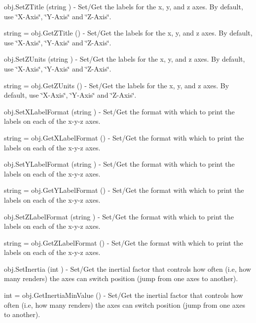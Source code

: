 \begin{DoxyItemize}
\item {\ttfamily obj.\-Set\-Z\-Title (string )} -\/ Set/\-Get the labels for the x, y, and z axes. By default, use \char`\"{}\-X-\/\-Axis\char`\"{}, \char`\"{}\-Y-\/\-Axis\char`\"{} and \char`\"{}\-Z-\/\-Axis\char`\"{}.  
\item {\ttfamily string = obj.\-Get\-Z\-Title ()} -\/ Set/\-Get the labels for the x, y, and z axes. By default, use \char`\"{}\-X-\/\-Axis\char`\"{}, \char`\"{}\-Y-\/\-Axis\char`\"{} and \char`\"{}\-Z-\/\-Axis\char`\"{}.  
\item {\ttfamily obj.\-Set\-Z\-Units (string )} -\/ Set/\-Get the labels for the x, y, and z axes. By default, use \char`\"{}\-X-\/\-Axis\char`\"{}, \char`\"{}\-Y-\/\-Axis\char`\"{} and \char`\"{}\-Z-\/\-Axis\char`\"{}.  
\item {\ttfamily string = obj.\-Get\-Z\-Units ()} -\/ Set/\-Get the labels for the x, y, and z axes. By default, use \char`\"{}\-X-\/\-Axis\char`\"{}, \char`\"{}\-Y-\/\-Axis\char`\"{} and \char`\"{}\-Z-\/\-Axis\char`\"{}.  
\item {\ttfamily obj.\-Set\-X\-Label\-Format (string )} -\/ Set/\-Get the format with which to print the labels on each of the x-\/y-\/z axes.  
\item {\ttfamily string = obj.\-Get\-X\-Label\-Format ()} -\/ Set/\-Get the format with which to print the labels on each of the x-\/y-\/z axes.  
\item {\ttfamily obj.\-Set\-Y\-Label\-Format (string )} -\/ Set/\-Get the format with which to print the labels on each of the x-\/y-\/z axes.  
\item {\ttfamily string = obj.\-Get\-Y\-Label\-Format ()} -\/ Set/\-Get the format with which to print the labels on each of the x-\/y-\/z axes.  
\item {\ttfamily obj.\-Set\-Z\-Label\-Format (string )} -\/ Set/\-Get the format with which to print the labels on each of the x-\/y-\/z axes.  
\item {\ttfamily string = obj.\-Get\-Z\-Label\-Format ()} -\/ Set/\-Get the format with which to print the labels on each of the x-\/y-\/z axes.  
\item {\ttfamily obj.\-Set\-Inertia (int )} -\/ Set/\-Get the inertial factor that controls how often (i.\-e, how many renders) the axes can switch position (jump from one axes to another).  
\item {\ttfamily int = obj.\-Get\-Inertia\-Min\-Value ()} -\/ Set/\-Get the inertial factor that controls how often (i.\-e, how many renders) the axes can switch position (jump from one axes to another).  

\end{DoxyItemize}
